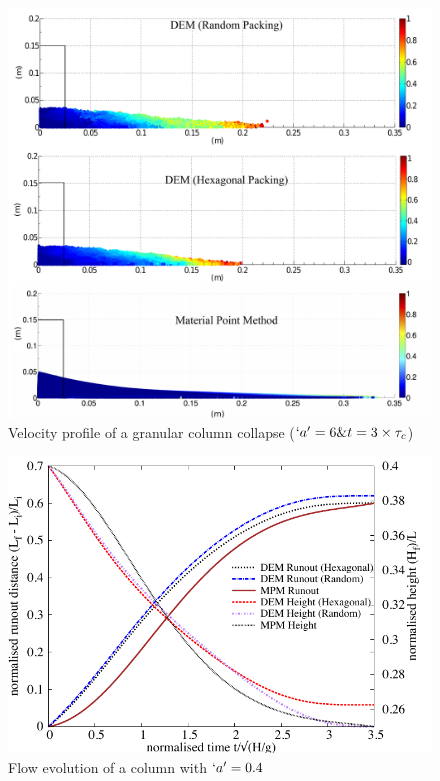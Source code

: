 \begin{figure}[tbhp]
\centering
\includegraphics[width=\textwidth]{a6f}
\caption{Velocity profile of a granular column collapse ($`a' = 6 \& 
t=3\times\tau_c$)}
\label{fig:a6f}
\end{figure}



\begin{figure}[tbhp]
\centering
\includegraphics[width=\textwidth]{flowa04}
\caption{Flow evolution of a column with $`a'=0.4$}
\label{fig:flowa04}
\end{figure}

